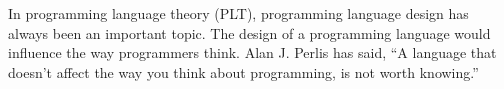 %
%
%
%
%

In programming language theory (PLT), programming language
design has always been an important topic.
The design of a programming language would influence the way programmers think.
Alan J. Perlis has said, “A language that doesn’t affect the
way you think about programming, is not worth knowing.”\cite{perlis1982special}

